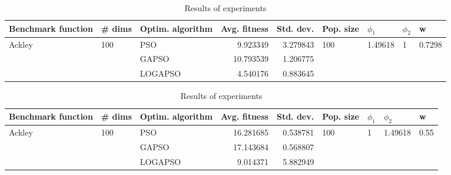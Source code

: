 \documentclass{article}
\begin{document}
\begin{table}
\centering
\caption{Results of experiments}
\begin{tabular}{lllrrllll}
\toprule
     Benchmark function &              \# dims & Optim. algorithm &  Avg. fitness &  Std. dev. &            Pop. size &               $\phi_{1}$ &         $\phi_{2}$ &                       w \\
\midrule
\multirow{3}{*}{Ackley} & \multirow{3}{*}{100} &              PSO &      9.923349 &   3.279843 & \multirow{3}{*}{100} & \multirow{3}{*}{1.49618} & \multirow{3}{*}{1} & \multirow{3}{*}{0.7298} \\
                        &                      &            GAPSO &     10.793539 &   1.206775 &                      &                          &                    &                         \\
                        &                      &          LOGAPSO &      4.540176 &   0.883645 &                      &                          &                    &                         \\
\bottomrule
\end{tabular}
\end{table}
\begin{table}
\centering
\caption{Results of experiments}
\begin{tabular}{lllrrllll}
\toprule
     Benchmark function &              \# dims & Optim. algorithm &  Avg. fitness &  Std. dev. &            Pop. size &         $\phi_{1}$ &               $\phi_{2}$ &                     w \\
\midrule
\multirow{3}{*}{Ackley} & \multirow{3}{*}{100} &              PSO &     16.281685 &   0.538781 & \multirow{3}{*}{100} & \multirow{3}{*}{1} & \multirow{3}{*}{1.49618} & \multirow{3}{*}{0.55} \\
                        &                      &            GAPSO &     17.143684 &   0.568807 &                      &                    &                          &                       \\
                        &                      &          LOGAPSO &      9.014371 &   5.882949 &                      &                    &                          &                       \\
\bottomrule
\end{tabular}
\end{table}
\end{document}
